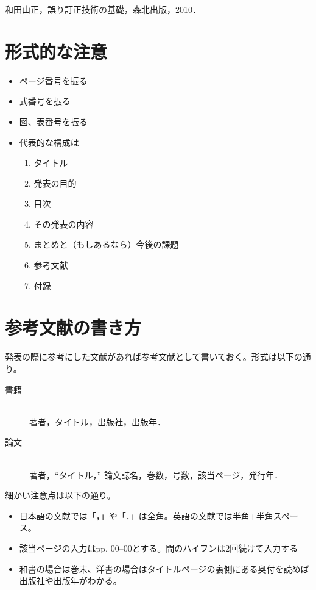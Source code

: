 \documentclass[a4j]{jsarticle}
\begin{document}
\begin{thebibliography}{99}
和田山正，誤り訂正技術の基礎，森北出版，2010．
\end{thebibliography}

\clearpage
{} %
\appendix
\section{形式的な注意}
\begin{itemize}
\item ページ番号を振る
\item 式番号を振る
\item 図、表番号を振る
\item 代表的な構成は
\begin{enumerate}
\item タイトル
\item 発表の目的
\item 目次
\item その発表の内容
\item まとめと（もしあるなら）今後の課題
\item 参考文献
\item 付録
\end{enumerate}
\end{itemize}

\section{参考文献の書き方}\label{reference}
発表の際に参考にした文献があれば参考文献として書いておく。形式は以下の通り。
\begin{description}
\item[書籍]\mbox{}\\
著者，タイトル，出版社，出版年．
\item[論文]\mbox{}\\
著者，``タイトル，'' 論文誌名，巻数，号数，該当ページ，発行年．
\end{description}
細かい注意点は以下の通り。
\begin{itemize}
\item 日本語の文献では「，」や「．」は全角。英語の文献では半角+半角スペース。
\item 該当ページの入力はpp. 00--00とする。間のハイフンは2回続けて入力する
\item 和書の場合は巻末、洋書の場合はタイトルページの裏側にある奥付を読めば出版社や出版年がわかる。
\end{itemize}
\end{document}
